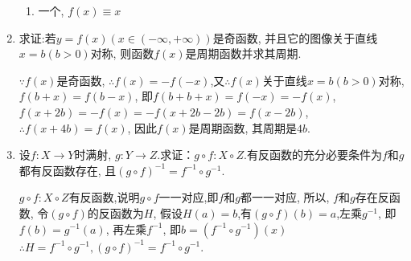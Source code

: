 \begin{enumerate}
\begin{solution}
\begin{enumerate}[(1)]
			\item 一个, $f(x) \equiv x$
		\end{enumerate}
	\end{solution}
\item 求证:若$y=f(x)(x\in (-\infty, +\infty))$是奇函数, 并且它的图像关于直线$x=b(b>0)$对称, 则函数$f(x)$是周期函数并求其周期.
\begin{solution}
	$\because f(x)$是奇函数, $\therefore f(x) = -f(-x)$,又$\therefore f(x)$关于直线$x=b(b>0)$对称, $f(b+x)=f(b-x)$, 即$f(b+b+x)=f(-x)=-f(x)$, $f(x+2b)=-f(x)=-f(x+2b-2b)=f(x-2b)$, $\therefore f(x+4b)=f(x)$, 因此$f(x)$是周期函数, 其周期是$4b$.
\end{solution}
\item 设$f: X\rightarrow Y$时满射, $g: Y\rightarrow Z$.求证：$g\circ f: X\circ Z$.有反函数的充分必要条件为$f$和$g$都有反函数存在, 且$(g\circ f)^{-1}=f^{-1} \circ g^{-1}$.
\begin{solution}
	$g\circ f:X\circ Z$有反函数,说明$g\circ f$一一对应,即$f$和$g$都一一对应, 所以, $f$和$g$存在反函数, 令$(g\circ f)$的反函数为$H$, 假设$H(a)=b$,有$(g\circ f)(b) = a$,左乘$g^{-1}$, 即$f(b) = g^{-1}(a)$, 再左乘$f^{-1}$, 即$b = (f^{-1}\circ g^{-1})(x)$\ $\therefore H=f^{-1}\circ g^{-1}, (g\circ f)^{-1} = f^{-1}\circ g^{-1}$.
\end{solution}
\end{enumerate}

